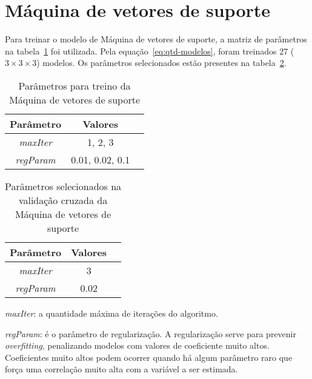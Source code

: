 \section{Máquina de vetores de suporte}
\label{sec:lsvc}

Para treinar o modelo de Máquina de vetores de suporte, a matriz de parâmetros na tabela~\ref{tab:param-lsvc} foi utilizada.
Pela equação~\ref{eq:qtd-modelos}, foram treinados 27 ($3 \times 3 \times 3$) modelos.
Os parâmetros selecionados estão presentes na tabela~\ref{tab:param-final-lsvc}.

\begin{table}[h]
    \centering
    \begin{tabular}{|c|c|c|}
        \hline
        Parâmetro         & Valores         \\ \hline
        \textit{maxIter}  & 1, 2, 3         \\
        \textit{regParam} & 0.01, 0.02, 0.1 \\ \hline
    \end{tabular}
    \caption{Parâmetros para treino da Máquina de vetores de suporte}
    \label{tab:param-lsvc}
\end{table}

\begin{table}[h]
    \centering
    \begin{tabular}{|c|c|c|}
        \hline
        Parâmetro         & Valores \\ \hline
        \textit{maxIter}  & 3       \\
        \textit{regParam} & 0.02    \\ \hline
    \end{tabular}
    \caption{Parâmetros selecionados na validação cruzada da Máquina de vetores de suporte}
    \label{tab:param-final-lsvc}
\end{table}

\textit{maxIter}: a quantidade máxima de iterações do algoritmo.

\textit{regParam}: é o parâmetro de regularização.
A regularização serve para prevenir \textit{overfitting}, penalizando modelos com valores de coeficiente muito altos.
Coeficientes muito altos podem ocorrer quando há algum parâmetro raro que força uma correlação muito alta com a variável a ser estimada.

